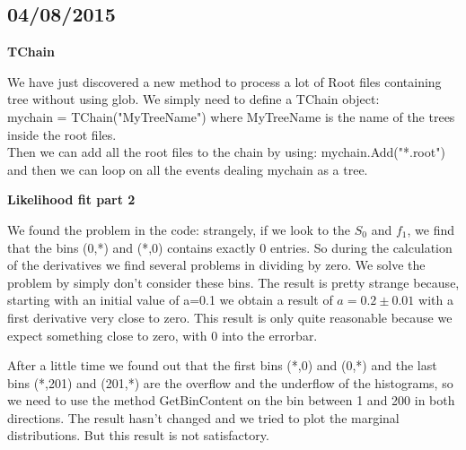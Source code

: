 \subsection{04/08/2015}

\textbf{TChain}

We have just discovered a new method to process a lot of Root files containing tree without using glob.
We simply need to define a TChain object:\\
mychain = TChain("MyTreeName")
where MyTreeName is the name of the trees inside the root files.\\
Then we can add all the root files to the chain by using:
mychain.Add("*.root")\\
and then we can loop on all the events dealing mychain as a tree.

\textbf{Likelihood fit part 2}

We found the problem in the code: strangely, if we look to the $S_0$ and $f_1$, we find that the bins (0,*) and (*,0) contains exactly 0 entries. So during the calculation of the derivatives we find several problems in dividing by zero. We solve the problem by simply don't consider these bins. The result is pretty strange because, starting with an initial value of a=0.1 we obtain a result of $a=0.2 \pm 0.01$ with a first derivative very close to zero. This result is only quite reasonable because we expect something close to zero, with 0 into the errorbar.

After a little time we found out that the first bins (*,0) and (0,*) and the last bins (*,201) and (201,*) are the overflow and the underflow of the histograms, so we need to use the method GetBinContent on the bin between 1 and 200 in both directions. The result hasn't changed and we tried to plot the marginal distributions. But this result is not satisfactory.